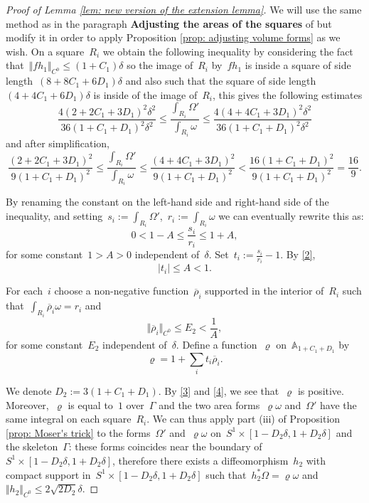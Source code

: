 \documentclass[10pt]{amsart}
\begin{document}
\begin{proof}[Proof of Lemma \ref{lem: new version of the extension lemma}]
\medskip

We will use the same method as in the paragraph \textbf{Adjusting the areas of the squares} of \cite{EPP} but modify it in order to apply Proposition \ref{prop: adjusting volume forms} as we wish. On a square~$R_i$ we obtain the following inequality by considering the fact that~$\Vert fh_1 \Vert_{C^0}\leq (1+C_1)\delta$ so the image of~$R_i$ by~$fh_1$ is inside a square of side length~$(8+8C_1+6D_1)\delta$ and also such that the square of side length~$(4+4C_1+6D_1)\delta$ is inside of the image of~$R_i$, this gives the following estimates
$$\dfrac{4(2+2C_1+3D_1)^2 \delta^2}{ 36(1+C_1+D_1)^2 \delta^2}\leq \dfrac{\int_{R_i}\Omega'}{\int_{R_i}\omega}\leq \dfrac{4(4+4C_1+3D_1)^2\delta^2}{36(1+C_1+D_1)^2\delta^2}$$
and after simplification, 
$$\dfrac{(2+2C_1+3D_1)^2}{9(1+C_1+D_1)^2}\leq \dfrac{\int_{R_i}\Omega'}{\int_{R_i}\omega}\leq \dfrac{(4+4C_1+3D_1)^2}{9(1+C_1+D_1)^2}<\dfrac{16(1+C_1+D_1)^2}{9(1+C_1+D_1)^2}=\dfrac{16}{9}.$$

By renaming the constant on the left-hand side and right-hand side of the inequality, and setting~$s_i:=\int_{R_i}\Omega'$,~$r_i:=\int_{R_i}\omega$ we can eventually rewrite this as: 
\begin{equation}
    0<1-A\leq \dfrac{s_i}{r_i}\leq 1+A,
    \label{2}
\end{equation}
for some constant~$1>A>0$ independent of~$\delta$. Set~$t_i:=\frac{s_i}{r_i}-1$. By \eqref{2}, 
\begin{equation}
    \vert t_i \vert \leq A<1.
    \label{3}
\end{equation}

For each~$i$ choose a non-negative function~$\overline{\rho}_i$ supported in the interior of~$R_i$ such that~$\int_{R_i}\overline{\rho}_i\omega=r_i$ and 
\begin{equation}
    \Vert \overline{\rho}_i \Vert_{C^0}\leq E_2 < \dfrac{1}{A},
    \label{4}
\end{equation}
for some constant~$E_2$ independent of~$\delta$. Define a function~$\varrho$ on~$\mathbb{A}_{1+C_1+D_1}$ by
$$\varrho=1+\sum_i t_i\overline{\rho}_i.$$

We denote $D_2:=3(1+C_1+D_1)$. By \eqref{3} and \eqref{4}, we see that~$\varrho$ is positive. Moreover,~$\varrho$ is equal to~$1$ over~$\Gamma$ and the two area forms~$\varrho \omega$ and~$\Omega'$ have the same integral on each square~$R_i$. We can thus apply part (iii) of Proposition \ref{prop: Moser's trick} to the forms~$\Omega'$ and~$\varrho\omega$ on~$S^1\times [1-D_2\delta, 1+D_2\delta]$ and the skeleton~$\Gamma$: these forms coincides near the boundary of~$S^1\times [1-D_2\delta, 1+D_2\delta]$, therefore there exists a diffeomorphism~$h_2$ with compact support in~$S^1\times [1-D_2\delta, 1+D_2\delta]$ such that~$h_2^*\Omega=\varrho\omega$ and~$\Vert h_2\Vert_{C^0}\leq 2\sqrt{2D_2}\delta$.


\end{proof}
\end{document}
